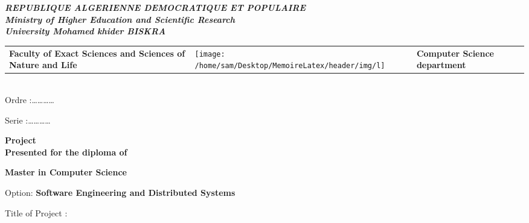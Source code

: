 \documentclass[12pt,oneside,frensh]{book}
\providecommand{\tabularnewline}{\\}
\begin{document}
\begin{titlepage}

\begin{center}
\textbf{\textsl{\large{}REPUBLIQUE ALGERIENNE DEMOCRATIQUE ET POPULAIRE}}\textbf{\textsl{\small{}}}\\
\textbf{\textsl{ Ministry of Higher Education and Scientific Research }}\textbf{\textsl{\small{}}}\\
\textbf{\textsl{  University Mohamed khider  {  \textendash{}
BISKRA}}}
\par\end{center}

\begin{tabular}{>{\centering}m{45mm}>{\centering}m{40mm}>{\centering}m{60mm}}
\centering{}\textbf{Faculty of Exact Sciences 
and Sciences of Nature and Life } & \centering

\texttt{[image: /home/sam/Desktop/MemoireLatex/header/img/l]} & \centering{}\textbf{Computer Science department}\tabularnewline
\end{tabular}\\


{\small{}Ordre :\dots \dots \dots \dots{} }{\small \par}

{\small{}Serie :\dots \dots \dots \dots{}}{\small \par}

\begin{center}
\textbf{Project}\\
\textbf{Presented for the diploma of }
\par\end{center}

\begin{center}
\textbf{\large{}Master in Computer Science }   
\par\end{center}

\begin{center}
Option: \textbf{Software Engineering and Distributed Systems }
\par\end{center}

\vspace*{10mm}

Title of Project :

\begin{center}
{\LARGE{}}%
\vspace*{10mm}


\end{center}
\end{titlepage}
\end{document}
